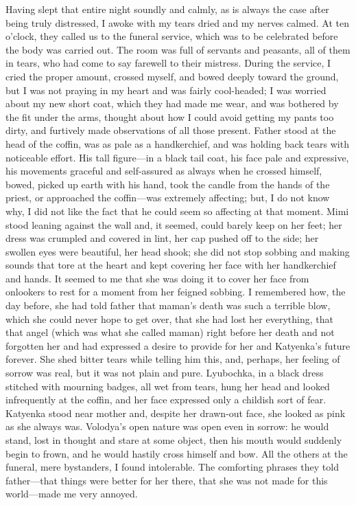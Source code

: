 Having slept that entire night soundly and calmly, as is always the case after being truly distressed, I awoke with my tears dried and my nerves calmed. At ten o'clock, they called us to the funeral service, which was to be celebrated before the body was carried out. The room was full of servants and peasants, all of them in tears, who had come to say farewell to their mistress. During the service, I cried the proper amount, crossed myself, and bowed deeply toward the ground, but I was not praying in my heart and was fairly cool-headed; I was worried about my new short coat, which they had made me wear, and was bothered by the fit under the arms, thought about how I could avoid getting my pants too dirty, and furtively made observations of all those present. Father stood at the head of the coffin, was as pale as a handkerchief, and was holding back tears with noticeable effort. His tall figure---in a black tail coat, his face pale and expressive, his movements graceful and self-assured as always when he crossed himself, bowed, picked up earth with his hand, took the candle from the hands of the priest, or approached the coffin---was extremely affecting; but, I do not know why, I did not like the fact that he could seem so affecting at that moment. Mimi stood leaning against the wall and, it seemed, could barely keep on her feet; her dress was crumpled and covered in lint, her cap pushed off to the side; her swollen eyes were beautiful, her head shook; she did not stop sobbing and making sounds that tore at the heart and kept covering her face with her handkerchief and hands. It seemed to me that she was doing it to cover her face from onlookers to rest for a moment from her feigned sobbing. I remembered how, the day before, she had told father that maman's death was such a terrible blow, which she could never hope to get over, that she had lost her everything, that that angel (which was what she called maman) right before her death and not forgotten her and had expressed a desire to provide for her and Katyenka's future forever. She shed bitter tears while telling him this, and, perhaps, her feeling of sorrow was real, but it was not plain and pure. Lyubochka, in a black dress stitched with mourning badges, all wet from tears, hung her head and looked infrequently at the coffin, and her face expressed only a childish sort of fear. Katyenka stood near mother and, despite her drawn-out face, she looked as pink as she always was. Volodya's open nature was open even in sorrow: he would stand, lost in thought and stare at some object, then his mouth would suddenly begin to frown, and he would hastily cross himself and bow. All the others at the funeral, mere bystanders, I found intolerable. The comforting phrases they told father---that things were better for her there, that she was not made for this world---made me very annoyed.

